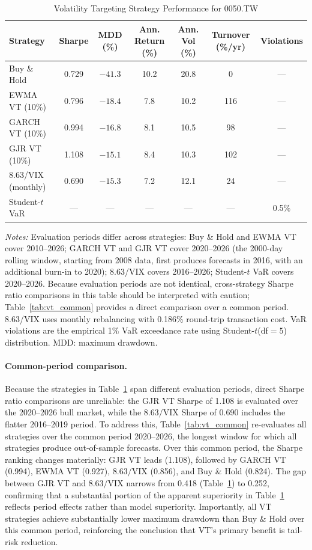 \begin{table}[H]
\centering
\caption{Volatility Targeting Strategy Performance for 0050.TW}
\label{tab:vt_results}
\begin{tabular}{lcccccc}
\toprule
Strategy & Sharpe & MDD (\%) & Ann. Return (\%) & Ann. Vol (\%) & Turnover (\%/yr) & Violations \\
\midrule
Buy \& Hold & 0.729 & $-41.3$ & 10.2 & 20.8 & 0 & --- \\
EWMA VT (10\%) & 0.796 & $-18.4$ & 7.8 & 10.2 & 116 & --- \\
GARCH VT (10\%) & 0.994 & $-16.8$ & 8.1 & 10.5 & 98 & --- \\
GJR VT (10\%) & 1.108 & $-15.1$ & 8.4 & 10.3 & 102 & --- \\
8.63/VIX (monthly) & 0.690 & $-15.3$ & 7.2 & 12.1 & 24 & --- \\
Student-$t$ VaR & --- & --- & --- & --- & --- & 0.5\% \\
\bottomrule
\end{tabular}
\begin{flushleft}
\small \textit{Notes:} Evaluation periods differ across strategies: Buy \& Hold and EWMA VT cover 2010--2026; GARCH VT and GJR VT cover 2020--2026 (the 2000-day rolling window, starting from 2008 data, first produces forecasts in 2016, with an additional burn-in to 2020); 8.63/VIX covers 2016--2026; Student-$t$ VaR covers 2020--2026. Because evaluation periods are not identical, cross-strategy Sharpe ratio comparisons in this table should be interpreted with caution; Table~\ref{tab:vt_common} provides a direct comparison over a common period. 8.63/VIX uses monthly rebalancing with 0.186\% round-trip transaction cost. VaR violations are the empirical 1\% VaR exceedance rate using Student-$t$(df$= 5$) distribution. MDD: maximum drawdown.
\end{flushleft}
\end{table}

\paragraph{Common-period comparison.} Because the strategies in Table~\ref{tab:vt_results} span different evaluation periods, direct Sharpe ratio comparisons are unreliable: the GJR VT Sharpe of 1.108 is evaluated over the 2020--2026 bull market, while the $8.63/\text{VIX}$ Sharpe of 0.690 includes the flatter 2016--2019 period. To address this, Table~\ref{tab:vt_common} re-evaluates all strategies over the common period 2020--2026, the longest window for which all strategies produce out-of-sample forecasts. Over this common period, the Sharpe ranking changes materially: GJR VT leads (1.108), followed by GARCH VT (0.994), EWMA VT (0.927), $8.63/\text{VIX}$ (0.856), and Buy \& Hold (0.824). The gap between GJR VT and $8.63/\text{VIX}$ narrows from 0.418 (Table~\ref{tab:vt_results}) to 0.252, confirming that a substantial portion of the apparent superiority in Table~\ref{tab:vt_results} reflects period effects rather than model superiority. Importantly, all VT strategies achieve substantially lower maximum drawdown than Buy \& Hold over this common period, reinforcing the conclusion that VT's primary benefit is tail-risk reduction.

